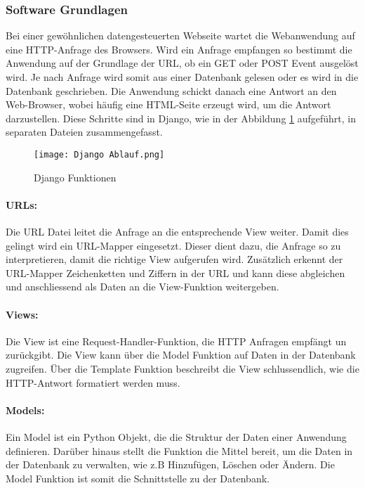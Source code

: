  \newpage
\subsubsection{Software Grundlagen}\label{subsubsec:SoftwareGrundlagen}
Bei einer gewöhnlichen datengesteuerten Webseite wartet die Webanwendung auf eine HTTP-Anfrage des Browsers. Wird ein Anfrage empfangen so bestimmt die Anwendung auf der Grundlage der URL, ob ein GET oder POST Event ausgelöst wird. Je nach Anfrage wird somit aus einer Datenbank gelesen oder es wird in die Datenbank geschrieben. Die Anwendung schickt danach eine Antwort an den Web-Browser, wobei häufig eine HTML-Seite erzeugt wird, um die Antwort darzustellen. Diese Schritte sind in Django, wie in der Abbildung \ref{fig:DjangoAblauf} aufgeführt,  in separaten Dateien zusammengefasst.
\begin{figure} [H]
	\centering
	\texttt{[image: Django Ablauf.png]}
	\caption{Django Funktionen \cite{mdn_web_docs_django_2019}}
	\label{fig:DjangoAblauf}
\end{figure}

\paragraph{URLs: }\label{par:1URLs}
Die URL Datei leitet die Anfrage an die entsprechende View weiter. Damit dies gelingt wird ein URL-Mapper eingesetzt. Dieser dient dazu, die Anfrage so zu interpretieren, damit die richtige View aufgerufen wird. Zusätzlich erkennt der URL-Mapper Zeichenketten und Ziffern in der URL und kann diese abgleichen und anschliessend als Daten an die View-Funktion weitergeben.

\paragraph{Views: }\label{par:1Views}
Die View ist eine Request-Handler-Funktion, die HTTP Anfragen empfängt un zurückgibt. Die View kann über die Model Funktion auf Daten in der Datenbank zugreifen. Über die Template Funktion beschreibt die View schlussendlich, wie die HTTP-Antwort formatiert werden muss.

\paragraph{Models: }\label{par:1Models}
Ein Model ist ein Python Objekt, die die Struktur der Daten einer Anwendung definieren. Darüber hinaus stellt die Funktion die Mittel bereit, um die Daten in der Datenbank zu verwalten, wie z.B Hinzufügen, Löschen oder Ändern. Die Model Funktion ist somit die Schnittstelle zu der Datenbank.

